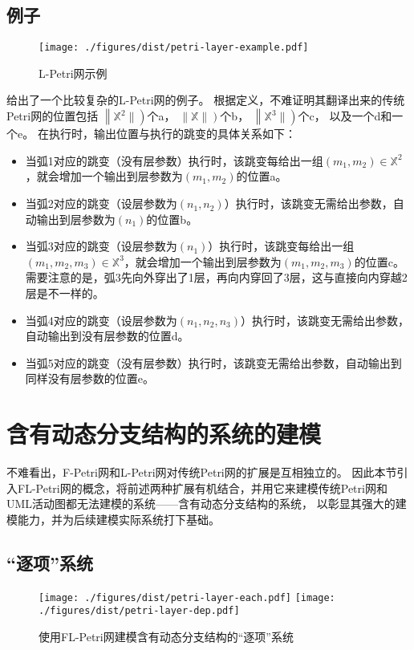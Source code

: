 \documentclass[index]{subfiles}
\begin{document}
\subsection{例子}
\begin{figure}[h]
  \centering
  \texttt{[image: ./figures/dist/petri-layer-example.pdf]}
  \caption{L-Petri网示例\label{fig:petri-layer}}
\end{figure}

给出了一个比较复杂的L-Petri网的例子。
根据定义，不难证明其翻译出来的传统Petri网的位置包括
$\left\|\mathbb{X}^{2}\|\right)$个a，
$\left\|\mathbb{X}\|\right)$个b，
$\left\|\mathbb{X}^{3}\|\right)$个c，
以及一个d和一个e。
在执行时，输出位置与执行的跳变的具体关系如下：
\begin{itemize}
  \item 当弧1对应的跳变（没有层参数）执行时，该跳变每给出一组$(m_1,m_2)\in\mathbb{X}^{2}$，就会增加一个输出到层参数为$(m_1,m_2)$的位置a。
  \item 当弧2对应的跳变（设层参数为$(n_1,n_2)$）执行时，该跳变无需给出参数，自动输出到层参数为$(n_1)$的位置b。
  \item 当弧3对应的跳变（设层参数为$(n_1)$）执行时，该跳变每给出一组$(m_1,m_2,m_3)\in\mathbb{X}^{3}$，就会增加一个输出到层参数为$(m_1,m_2,m_3)$的位置c。
    需要注意的是，弧3先向外穿出了1层，再向内穿回了3层，这与直接向内穿越2层是不一样的。
  \item 当弧4对应的跳变（设层参数为$(n_1,n_2,n_3)$）执行时，该跳变无需给出参数，自动输出到没有层参数的位置d。
  \item 当弧5对应的跳变（没有层参数）执行时，该跳变无需给出参数，自动输出到同样没有层参数的位置e。
\end{itemize}

\section{含有动态分支结构的系统的建模}
不难看出，F-Petri网和L-Petri网对传统Petri网的扩展是互相独立的。
因此本节引入FL-Petri网的概念，将前述两种扩展有机结合，并用它来建模传统Petri网和UML活动图都无法建模的系统——含有动态分支结构的系统，
以彰显其强大的建模能力，并为后续建模实际系统打下基础。

\subsection{“逐项”系统}
\begin{figure}[h]
  \centering%
    {\texttt{[image: ./figures/dist/petri-layer-each.pdf]}}
  \hspace{1em}
    {\texttt{[image: ./figures/dist/petri-layer-dep.pdf]}}
  \caption{使用FL-Petri网建模含有动态分支结构的“逐项”系统}
\end{figure}
\end{document}
